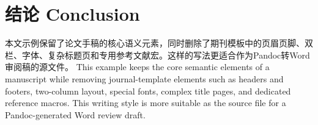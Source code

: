 \documentclass[12pt,a4paper]{article}
\begin{document}
\section{结论 Conclusion}
\label{sec:conclusion}

本文示例保留了论文手稿的核心语义元素，同时删除了期刊模板中的页眉页脚、双栏、字体、复杂标题页和专用参考文献宏。这样的写法更适合作为Pandoc转Word审阅稿的源文件。 This example keeps the core semantic elements of a manuscript while removing journal-template elements such as headers and footers, two-column layout, special fonts, complex title pages, and dedicated reference macros. This writing style is more suitable as the source file for a Pandoc-generated Word review draft.




\end{document}
